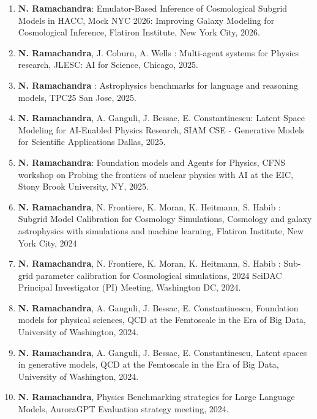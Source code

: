 \documentclass[letterpaper]{article}
\begin{document}
\begin{enumerate}

\item \textbf{N. Ramachandra}: Emulator-Based Inference of Cosmological Subgrid Models in HACC, Mock NYC 2026: Improving Galaxy Modeling for Cosmological Inference, Flatiron Institute, New York City, 2026.

\item \textbf{N. Ramachandra}, J. Coburn, A. Wells : Multi-agent systems for Physics research, JLESC: AI for Science, Chicago, 2025. 

\item \textbf{N. Ramachandra} : Astrophysics benchmarks for language and reasoning models, TPC25 San Jose, 2025. 

\item \textbf{N. Ramachandra}, A. Ganguli, J. Bessac, E. Constantinescu: Latent Space Modeling for AI-Enabled Physics Research, SIAM CSE - Generative Models for Scientific Applications Dallas, 2025.

\item \textbf{N. Ramachandra}: Foundation models and Agents for Physics, CFNS workshop on Probing the frontiers of nuclear physics with AI at the EIC, Stony Brook University, NY, 2025. 

\item \textbf{N. Ramachandra}, N. Frontiere, K. Moran, K. Heitmann, S. Habib : Subgrid Model Calibration for Cosmology Simulations, Cosmology and galaxy astrophysics with simulations and machine learning, Flatiron Institute, New York City, 2024 

\item \textbf{N. Ramachandra}, N. Frontiere, K. Moran, K. Heitmann, S. Habib : Sub-grid parameter calibration for Cosmological
simulations, 2024 SciDAC Principal Investigator (PI) Meeting, Washington DC, 2024.

\item \textbf{N. Ramachandra}, A. Ganguli, J. Bessac, E. Constantinescu, Foundation models for physical sciences, QCD at the Femtoscale in the Era of Big Data, University of Washington, 2024.

\item \textbf{N. Ramachandra}, A. Ganguli, J. Bessac, E. Constantinescu, Latent spaces in generative models, QCD at the Femtoscale in the Era of Big Data, University of Washington, 2024.

\item \textbf{N. Ramachandra}, Physics Benchmarking strategies for Large Language Models, AuroraGPT Evaluation strategy meeting, 2024.


\end{enumerate}
\end{document}
